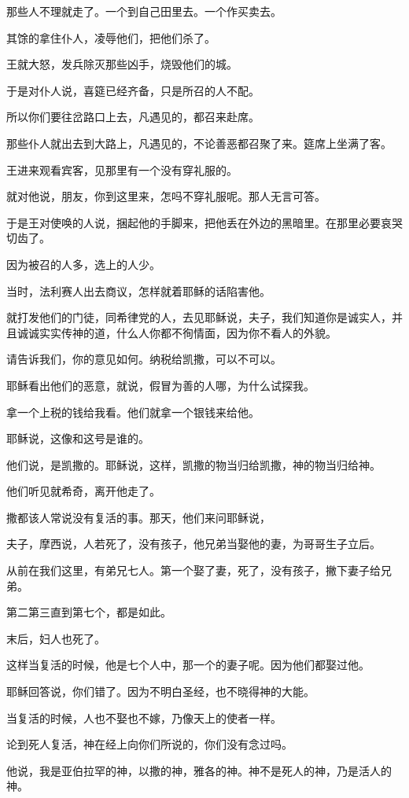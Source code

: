 \documentclass[12pt,oneside]{book}
\begin{document}
那些人不理就走了。一个到自己田里去。一个作买卖去。

其馀的拿住仆人，凌辱他们，把他们杀了。

王就大怒，发兵除灭那些凶手，烧毁他们的城。

于是对仆人说，喜筵已经齐备，只是所召的人不配。

所以你们要往岔路口上去，凡遇见的，都召来赴席。

那些仆人就出去到大路上，凡遇见的，不论善恶都召聚了来。筵席上坐满了客。

王进来观看宾客，见那里有一个没有穿礼服的。

就对他说，朋友，你到这里来，怎吗不穿礼服呢。那人无言可答。

于是王对使唤的人说，捆起他的手脚来，把他丢在外边的黑暗里。在那里必要哀哭切齿了。

因为被召的人多，选上的人少。

当时，法利赛人出去商议，怎样就着耶稣的话陷害他。

就打发他们的门徒，同希律党的人，去见耶稣说，夫子，我们知道你是诚实人，并且诚诚实实传神的道，什么人你都不徇情面，因为你不看人的外貌。

请告诉我们，你的意见如何。纳税给凯撒，可以不可以。

耶稣看出他们的恶意，就说，假冒为善的人哪，为什么试探我。

拿一个上税的钱给我看。他们就拿一个银钱来给他。

耶稣说，这像和这号是谁的。

他们说，是凯撒的。耶稣说，这样，凯撒的物当归给凯撒，神的物当归给神。

他们听见就希奇，离开他走了。

撒都该人常说没有复活的事。那天，他们来问耶稣说，

夫子，摩西说，人若死了，没有孩子，他兄弟当娶他的妻，为哥哥生子立后。

从前在我们这里，有弟兄七人。第一个娶了妻，死了，没有孩子，撇下妻子给兄弟。

第二第三直到第七个，都是如此。

末后，妇人也死了。

这样当复活的时候，他是七个人中，那一个的妻子呢。因为他们都娶过他。

耶稣回答说，你们错了。因为不明白圣经，也不晓得神的大能。

当复活的时候，人也不娶也不嫁，乃像天上的使者一样。

论到死人复活，神在经上向你们所说的，你们没有念过吗。

他说，我是亚伯拉罕的神，以撒的神，雅各的神。神不是死人的神，乃是活人的神。
\end{document}
